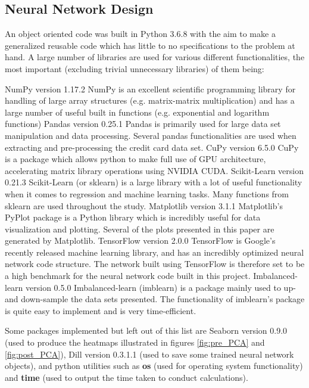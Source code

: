     \subsection{Neural Network Design}
        An object oriented code was built in Python 3.6.8 with the aim to make a generalized reusable code which has little to no specifications to the problem at hand. A large number of libraries are used for various different functionalities, the most important (excluding trivial unnecessary libraries) of them being:
        \begin{outline}[itemize]
            \1 NumPy version 1.17.2
                \2 NumPy is an excellent scientific programming library for handling of large array structures (e.g. matrix-matrix multiplication) and has a large number of useful built in functions (e.g. exponential and logarithm functions)
            \1 Pandas version 0.25.1
                \2 Pandas is primarily used for large data set manipulation and data processing. Several pandas functionalities are used when extracting and pre-processing the credit card data set.
            \1 CuPy version 6.5.0
            	\2 CuPy is a package which allows python to make full use of GPU architecture, accelerating matrix library operations using NVIDIA CUDA.
            \1 Scikit-Learn version 0.21.3
                \2 Scikit-Learn (or sklearn) is a large library with a lot of useful functionality when it comes to regression and machine learning tasks. Many functions from sklearn are used throughout the study.
            \1 Matplotlib version 3.1.1
                \2 Matplotlib's PyPlot package is a Python library which is incredibly useful for data visualization and plotting. Several of the plots presented in this paper are generated by Matplotlib.
            \1 TensorFlow version 2.0.0
                \2 TensorFlow is Google's recently released machine learning library, and has an incredibly optimized neural network code structure. The network built using TensorFlow is therefore set to be a high benchmark for the neural network code built in this project.
            \1 Imbalanced-learn version 0.5.0
                \2 Imbalanced-learn (imblearn) is a package mainly used to up- and down-sample the data sets presented. The functionality of imblearn's package is quite easy to implement and is very time-efficient.
        \end{outline}
        Some packages implemented but left out of this list are Seaborn version 0.9.0 (used to produce the heatmaps illustrated in figures \ref{fig:pre_PCA} and \ref{fig:post_PCA}), Dill version 0.3.1.1 (used to save some trained neural network objects), and python utilities such as \textbf{os} (used for operating system functionality) and \textbf{time} (used to output the time taken to conduct calculations).
        
